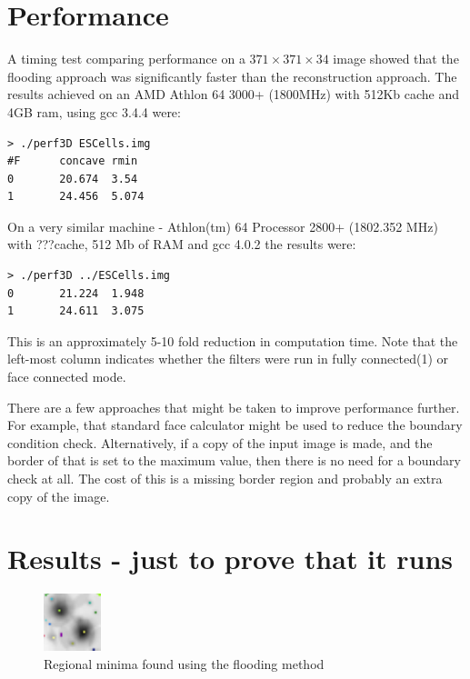 \documentclass{llncs}
\begin{document}
\section{Performance}
A timing test comparing performance on a $371 \times 371 \times 34$
image showed that the flooding approach was significantly faster than
the reconstruction approach. The results achieved on an AMD Athlon 64
3000+ (1800MHz) with 512Kb cache and 4GB ram, using gcc 3.4.4 were:
\begin{verbatim}
> ./perf3D ESCells.img
#F      concave rmin
0       20.674  3.54
1       24.456  5.074
\end{verbatim}
On a very similar machine - Athlon(tm) 64 Processor 2800+ (1802.352
MHz) with ???cache, 512 Mb of RAM and gcc 4.0.2 the results were:
\begin{verbatim}
> ./perf3D ../ESCells.img
0       21.224  1.948
1       24.611  3.075
\end{verbatim}

This is an approximately 5-10 fold reduction in computation time. Note
that the left-most column indicates whether the filters were run in
fully connected(1) or face connected mode.

There are a few approaches that might be taken to improve performance
further. For example, that standard face calculator might be used to
reduce the boundary condition check. Alternatively, if a copy of the
input image is made, and the border of that is set to the maximum
value, then there is no need for a boundary check at all. The cost of
this is a missing border region and probably an extra copy of the
image.

\section{Results - just to prove that it runs}
\begin{figure}[htbp]
\begin{center}
\includegraphics[scale=3]{reg_min_ov}
\caption{Regional minima found using the flooding method}
\end{center}
\end{figure}
\end{document}

